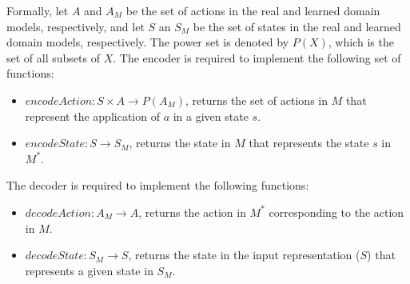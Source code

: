 \documentclass{article}
\theoremstyle{definition}
\theoremstyle{remark}
\newcommand{\realm}{\ensuremath{M^*}\xspace}
\begin{document}
Formally, let $A$ and $A_M$ be the set of actions in the real and learned domain models, respectively, and let $S$ an $S_M$ be the set of states in the real and learned domain models, respectively. The power set is denoted by $P(X)$, which is the set of all subsets of $X$. 
The encoder is required to implement the following set of functions:
\begin{itemize}
    \item ${\mathit{encodeAction}: S\times A\rightarrow P(A_M)}$, returns the set of actions in $M$ that represent the application of $a$ in a given state $s$. 
    \item ${\mathit{encodeState}: S\rightarrow S_M}$, returns the state in $M$ that represents the state $s$ in $\realm$.
\end{itemize}
The decoder is required to implement the following functions:
\begin{itemize}
    \item ${\mathit{decodeAction}: A_M\rightarrow A}$, returns the action in $\realm$ corresponding to the action in $M$. 
    \item ${\mathit{decodeState}: S_M\rightarrow S}$, returns the state in the input representation ($S$) that represents a given state in $S_M$. 
\end{itemize}





    
    




\end{document}
